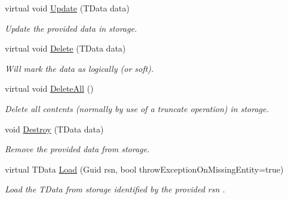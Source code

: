 \begin{DoxyCompactItemize}
virtual void \hyperlink{classCqrs_1_1Repositories_1_1Repository_a893276506e64034992d2c29d5ef11100_a893276506e64034992d2c29d5ef11100}{Update} (T\+Data data)
\begin{DoxyCompactList}\small\item\em Update the provided {\itshape data}  in storage. \end{DoxyCompactList}\item 
virtual void \hyperlink{classCqrs_1_1Repositories_1_1Repository_ac9d88baa6afcea85553fd233ba406e48_ac9d88baa6afcea85553fd233ba406e48}{Delete} (T\+Data data)
\begin{DoxyCompactList}\small\item\em Will mark the {\itshape data}  as logically (or soft). \end{DoxyCompactList}\item 
virtual void \hyperlink{classCqrs_1_1Repositories_1_1Repository_a6b6b50d476a351fc7fbd194cb8fa44d0_a6b6b50d476a351fc7fbd194cb8fa44d0}{Delete\+All} ()
\begin{DoxyCompactList}\small\item\em Delete all contents (normally by use of a truncate operation) in storage. \end{DoxyCompactList}\item 
void \hyperlink{classCqrs_1_1Repositories_1_1Repository_a6ed69cb5542164d9de81b0fa8a549d3e_a6ed69cb5542164d9de81b0fa8a549d3e}{Destroy} (T\+Data data)
\begin{DoxyCompactList}\small\item\em Remove the provided {\itshape data}  from storage. \end{DoxyCompactList}\item 
virtual T\+Data \hyperlink{classCqrs_1_1Repositories_1_1Repository_a444e9dfe4710be90940dbb6dec9d856f_a444e9dfe4710be90940dbb6dec9d856f}{Load} (Guid rsn, bool throw\+Exception\+On\+Missing\+Entity=true)
\begin{DoxyCompactList}\small\item\em Load the {\itshape T\+Data}  from storage identified by the provided {\itshape rsn} . \end{DoxyCompactList}\end{DoxyCompactItemize}
